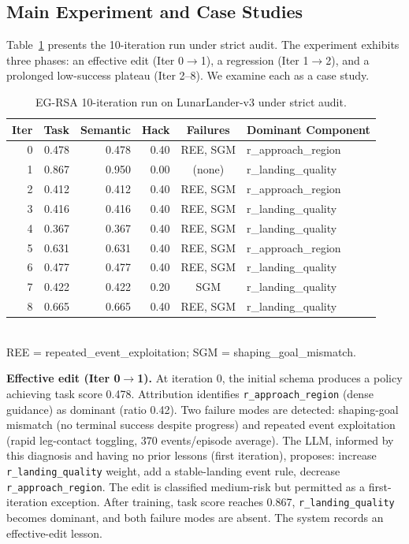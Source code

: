 \documentclass[11pt]{article}
\begin{document}
\subsection{Main Experiment and Case Studies}

Table~\ref{tab:strict-audit} presents the 10-iteration run under strict audit. The experiment exhibits three phases: an effective edit (Iter 0$\to$1), a regression (Iter 1$\to$2), and a prolonged low-success plateau (Iter 2--8). We examine each as a case study.

\begin{table}[t]
\centering
\caption{EG-RSA 10-iteration run on LunarLander-v3 under strict audit.}
\label{tab:strict-audit}
\begin{tabular}{r r r r c l}
\toprule
Iter & Task & Semantic & Hack & Failures & Dominant Component \\
\midrule
0 & 0.478 & 0.478 & 0.40 & REE, SGM & r\_approach\_region \\
1 & 0.867 & 0.950 & 0.00 & (none) & r\_landing\_quality \\
2 & 0.412 & 0.412 & 0.40 & REE, SGM & r\_approach\_region \\
3 & 0.416 & 0.416 & 0.40 & REE, SGM & r\_landing\_quality \\
4 & 0.367 & 0.367 & 0.40 & REE, SGM & r\_landing\_quality \\
5 & 0.631 & 0.631 & 0.40 & REE, SGM & r\_approach\_region \\
6 & 0.477 & 0.477 & 0.40 & REE, SGM & r\_landing\_quality \\
7 & 0.422 & 0.422 & 0.20 & SGM & r\_landing\_quality \\
8 & 0.665 & 0.665 & 0.40 & REE, SGM & r\_landing\_quality \\
\bottomrule
\end{tabular}
\smallskip\\
{\footnotesize REE = repeated\_event\_exploitation; SGM = shaping\_goal\_mismatch.}
\end{table}

\textbf{Effective edit (Iter 0$\to$1).} At iteration 0, the initial schema produces a policy achieving task score 0.478. Attribution identifies \texttt{r\_approach\_region} (dense guidance) as dominant (ratio 0.42). Two failure modes are detected: shaping-goal mismatch (no terminal success despite progress) and repeated event exploitation (rapid leg-contact toggling, 370 events/episode average). The LLM, informed by this diagnosis and having no prior lessons (first iteration), proposes: increase \texttt{r\_landing\_quality} weight, add a stable-landing event rule, decrease \texttt{r\_approach\_region}. The edit is classified medium-risk but permitted as a first-iteration exception. After training, task score reaches 0.867, \texttt{r\_landing\_quality} becomes dominant, and both failure modes are absent. The system records an effective-edit lesson.
\end{document}
